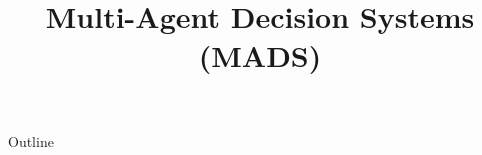 \documentclass[xcolor=dvipsnames,compress,t,pdf,9pt]{beamer}
\title[\insertframenumber /\inserttotalframenumber]{Multi-Agent Decision Systems (MADS)}
\begin{document}
	\begin{frame}
	\titlepage
	\end{frame}

	\begin{frame}{Outline}
	    \tableofcontents
	\end{frame}

	
	
	
\end{document}
